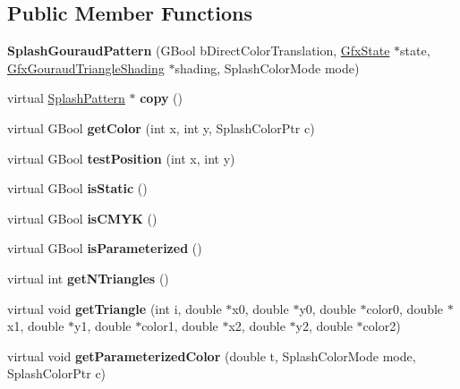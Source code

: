 \subsection*{Public Member Functions}
\begin{DoxyCompactItemize}
\item 
\mbox{\label{class_splash_gouraud_pattern_a9d7b95a4f2a57a5e28d5eb4b201cf09d}} 
{\bfseries Splash\+Gouraud\+Pattern} (G\+Bool b\+Direct\+Color\+Translation, \hyperlink{class_gfx_state}{Gfx\+State} $\ast$state, \hyperlink{class_gfx_gouraud_triangle_shading}{Gfx\+Gouraud\+Triangle\+Shading} $\ast$shading, Splash\+Color\+Mode mode)
\item 
\mbox{\label{class_splash_gouraud_pattern_ae4d958e1bd190e81ae41ebb5e6db2604}} 
virtual \hyperlink{class_splash_pattern}{Splash\+Pattern} $\ast$ {\bfseries copy} ()
\item 
\mbox{\label{class_splash_gouraud_pattern_ac6345a79f6f311bd58b62da0bb5b000a}} 
virtual G\+Bool {\bfseries get\+Color} (int x, int y, Splash\+Color\+Ptr c)
\item 
\mbox{\label{class_splash_gouraud_pattern_ab95ba2bb604f98befbeaf066630d9d6f}} 
virtual G\+Bool {\bfseries test\+Position} (int x, int y)
\item 
\mbox{\label{class_splash_gouraud_pattern_ab06c4a6a6292f7453b86f897d007702c}} 
virtual G\+Bool {\bfseries is\+Static} ()
\item 
\mbox{\label{class_splash_gouraud_pattern_a963937fb10b1a3aa2efb8f8b8c304609}} 
virtual G\+Bool {\bfseries is\+C\+M\+YK} ()
\item 
\mbox{\label{class_splash_gouraud_pattern_a5187b7319b3283c48e96480fd4e91c30}} 
virtual G\+Bool {\bfseries is\+Parameterized} ()
\item 
\mbox{\label{class_splash_gouraud_pattern_a645aa4986ba995bd6d0d8320ab9c6171}} 
virtual int {\bfseries get\+N\+Triangles} ()
\item 
\mbox{\label{class_splash_gouraud_pattern_a5deb72c55ede3d1c629ac94340332d80}} 
virtual void {\bfseries get\+Triangle} (int i, double $\ast$x0, double $\ast$y0, double $\ast$color0, double $\ast$x1, double $\ast$y1, double $\ast$color1, double $\ast$x2, double $\ast$y2, double $\ast$color2)
\item 
\mbox{\label{class_splash_gouraud_pattern_a5225786af2680e9a5a46d4b386f3a471}} 
virtual void {\bfseries get\+Parameterized\+Color} (double t, Splash\+Color\+Mode mode, Splash\+Color\+Ptr c)
\end{DoxyCompactItemize}



